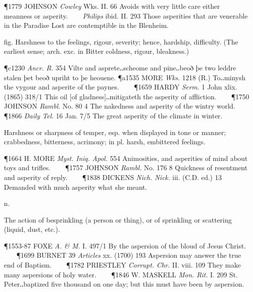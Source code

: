 \begin{description}[wide, labelwidth=!, labelindent=0pt]
\begin{myenumerate}
\P 1779 JOHNSON  \textit{Cowley} Wks. II. 66 Avoids with very little care either meanness or asperity.     \textit{Philips} ibid. II. 293 Those asperities that are venerable in the Paradise Lost are contemptible in the Blenheim.

 fig. Harshness to the feelings, rigour, severity; hence, hardship, difficulty. (The earliest sense; arch. exc. in  Bitter coldness, rigour, bleakness.)

\P c1230 \textit{Ancr. R.} 354 Vilte and asprete‥scheome and pine‥beoð þe two leddre stalen þet beoð upriht to þe heouene.
\P a1535 MORE \textit{Wks.} 1218 (R.) To‥minysh the vygour and asperite of the paynes.    
\P 1659 HARDY  \textit{Serm.} 1 John xlix. (1865) 318/1 This oil [of gladness]‥mitigateth the asperity of affliction.    
\P 1750 JOHNSON  \textit{Rambl.} No. 80 4 The nakedness and asperity of the wintry world.    
\P 1866 \textit{Daily Tel.} 16 Jan. 7/5 The great asperity of the climate in winter.

 Harshness or sharpness of temper, esp. when displayed in tone or manner; crabbedness, bitterness, acrimony; in pl. harsh, embittered feelings.

\P 1664 H. MORE  \textit{Myst. Iniq. Apol.} 554 Animosities, and asperities of mind about toys and trifles.    
\P 1757 JOHNSON  \textit{Rambl.} No. 176 8 Quickness of resentment and asperity of reply.    
\P 1838 DICKENS  \textit{Nich. Nick.} iii. (C.D. ed.) 13 Demanded with much asperity what she meant.
\end{myenumerate}


 n.

\noindent {}

\vspace{-0.3cm}

\begin{myenumerate}

 The action of besprinkling (a person or thing), or of sprinkling or scattering (liquid, dust, etc.).

\P 1553-87 FOXE  \textit{A. \& M.} I. 497/1 By the aspersion of the bloud of Jesus Christ.    
\P 1699 BURNET  39 \textit{Articles} xx. (1700) 193 Aspersion may answer the true end of Baptism.    
\P 1782 PRIESTLEY  \textit{Corrupt. Chr.} II. viii. 109 They make many aspersions of holy water.    
\P 1846 W. MASKELL  \textit{Mon. Rit.} I. 209 St. Peter‥baptized five thousand on one day; but this must have been by aspersion.


\end{myenumerate}
\end{description}
